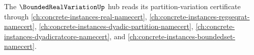 The $\BoundedRealVariationUp$ hub reads its partition-variation certificate through \autoref{ch:concrete-instances-real-namecert}, \autoref{ch:concrete-instances-regseqrat-namecert}, \autoref{ch:concrete-instances-dyadic-partition-namecert}, \autoref{ch:concrete-instances-dyadicratcore-namecert}, and \autoref{ch:concrete-instances-boundedset-namecert}.


